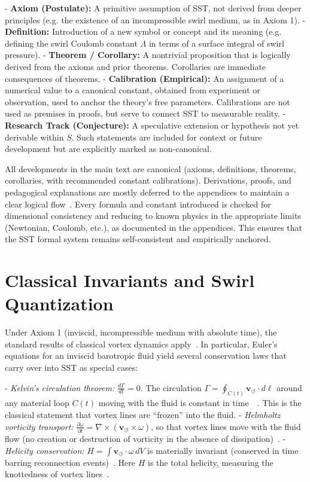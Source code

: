 \documentclass[aps,onecolumn,10pt,nofootinbib]{revtex4}
\newcommand{\swirlarrow}{\circlearrowleft} %
\newcommand{\vswirl}{\mathbf{v}_{\!\swirlarrow}}     %
\begin{document}
	- \textbf{Axiom (Postulate):} A primitive assumption of SST, not derived from deeper principles (e.g. the existence of an incompressible swirl medium, as in Axiom 1).
	- \textbf{Definition:} Introduction of a new symbol or concept and its meaning (e.g. defining the swirl Coulomb constant $\Lambda$ in terms of a surface integral of swirl pressure).
	- \textbf{Theorem / Corollary:} A nontrivial proposition that is logically derived from the axioms and prior theorems. Corollaries are immediate consequences of theorems.
	- \textbf{Calibration (Empirical):} An assignment of a numerical value to a canonical constant, obtained from experiment or observation, used to anchor the theory’s free parameters. Calibrations are not used as premises in proofs, but serve to connect SST to measurable reality.
	- \textbf{Research Track (Conjecture):} A speculative extension or hypothesis not yet derivable within $S$. Such statements are included for context or future development but are explicitly marked as non-canonical.

	All developments in the main text are canonical (axioms, definitions, theorems, corollaries, with recommended constant calibrations). Derivations, proofs, and pedagogical explanations are mostly deferred to the appendices to maintain a clear logical flow~\cite{index29}. Every formula and constant introduced is checked for dimensional consistency and reducing to known physics in the appropriate limits (Newtonian, Coulomb, etc.), as documented in the appendices. This ensures that the SST formal system remains self-consistent and empirically anchored.


	\section{Classical Invariants and Swirl Quantization}
	Under Axiom 1 (inviscid, incompressible medium with absolute time), the standard results of classical vortex dynamics apply~\cite{index30}. In particular, Euler’s equations for an inviscid barotropic fluid yield several conservation laws that carry over into SST as special cases:

	- \emph{Kelvin’s circulation theorem:} $\displaystyle \frac{d\Gamma}{dt} = 0$. The circulation $\Gamma = \oint_{C(t)} \vswirl \cdot d\ell$ around any material loop $C(t)$ moving with the fluid is constant in time~\cite{index31}~\cite{index32}. This is the classical statement that vortex lines are “frozen” into the fluid.
	- \emph{Helmholtz vorticity transport:} $\displaystyle \frac{\partial \omega}{\partial t} = \nabla \times (\vswirl \times \omega)$, so that vortex lines move with the fluid flow (no creation or destruction of vorticity in the absence of dissipation)~\cite{index33}.
	- \emph{Helicity conservation:} $H = \int \vswirl \cdot \omega\, dV$ is materially invariant (conserved in time barring reconnection events)~\cite{index34}. Here $H$ is the total helicity, measuring the knottedness of vortex lines~\cite{index35}.
\end{document}
